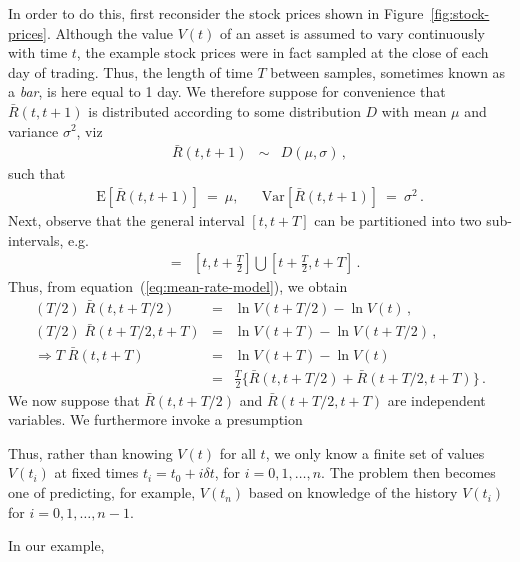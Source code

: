 \documentclass[a4paper]{book}
\begin{document}
In order to do this, first reconsider
the stock prices shown in Figure~\ref{fig:stock-prices}.
Although the value $V(t)$ of an asset is assumed to vary continuously with time $t$, the example stock prices were in
fact sampled at the close of each day of trading.
Thus, the length of time $T$ between samples,
sometimes known as a {\em bar}, is here equal to 1 day.
We therefore suppose for convenience that $\bar{R}(t,t+1)$
is distributed according to some distribution $D$ with mean
$\mu$ and variance $\sigma^2$, viz
\begin{eqnarray}
  \bar{R}(t,t+1) & \sim & D(\mu,\sigma)\,,
\end{eqnarray}
such that
\begin{eqnarray}
  \mbox{E}[\bar{R}(t,t+1)]~=~\mu, && 
\mbox{Var}[\bar{R}(t,t+1)]~=~\sigma^2\,.
\end{eqnarray}
Next, observe that the general interval $[t,t+T]$ can be partitioned into
two sub-intervals, e.g.
\begin{eqnarray}
[t,t+T] & = & \left[t,t+\frac{T}{2}\right]\bigcup 
\left[t+\frac{T}{2},t+T\right]\,.
\end{eqnarray}
Thus, from equation~(\ref{eq:mean-rate-model}), we obtain
\begin{eqnarray}
(T/2)\;\bar{R}(t,t+T/2) & = & \ln V(t+T/2) - \ln V(t)\,,\\
(T/2)\;\bar{R}(t+T/2,t+T) & = & \ln V(t+T) - \ln V(t+T/2)\,,\\
\Rightarrow T\;\bar{R}(t,t+T) & = & \ln V(t+T) - \ln V(t)
\nonumber\\
& = & \frac{T}{2}\{\bar{R}(t,t+T/2)+\bar{R}(t+T/2,t+T)\}
\,.
\end{eqnarray}
We now suppose that $\bar{R}(t,t+T/2)$ and $\bar{R}(t+T/2,t+T)$
are independent variables. We furthermore invoke a presumption

Thus, rather than knowing $V(t)$ for all $t$, we only know
a finite set of values $V(t_i)$ at fixed times $t_i=t_0+i\delta t$,
for $i=0,1,\ldots,n$. 
The problem then becomes one of predicting, for example, $V(t_n)$
based on knowledge of the history $V(t_i)$ for $i=0,1,\ldots,n-1$.

In our example, 
\end{document}

